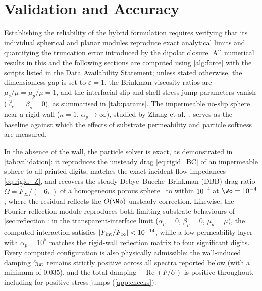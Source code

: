 \section{Validation and Accuracy}\label{sec:validation}

Establishing the reliability of the hybrid formulation requires verifying that its individual spherical and planar
modules reproduce exact analytical limits and quantifying the truncation error introduced by the dipolar closure. All
numerical results in this and the following sections are computed using \cref{alg:force} with the scripts listed in the
Data Availability Statement; unless stated otherwise, the dimensionless gap is set to $\varepsilon=1$, the Brinkman
viscosity ratios are $\mu_s/\mu=\mu_p/\mu=1$, and the interfacial slip and shell stress-jump parameters vanish
($\hat\ell_c=\beta_s=0$), as summarised in \cref{tab:params}. The impermeable no-slip sphere near a rigid wall
($\kappa=1$, $\alpha_p\to\infty$), studied by Zhang et al.~\cite{zhang2023unsteady}, serves as the baseline against which
the effects of substrate permeability and particle softness are measured.

In the absence of the wall, the particle solver is exact, as demonstrated in \cref{tab:validation}: it reproduces the
unsteady drag \eqref{eq:rigid_BC} of an impermeable sphere to all printed digits, matches the exact incident-flow
impedances \eqref{eq:rigid_Z}, and recovers the steady Debye--Bueche--Brinkman (DBB) drag ratio $\Omega=\hat
F_\infty/(-6\pi)$ of a homogeneous porous sphere~\cite{brinkman1949calculation} to within $10^{-4}$ at $\Wo=10^{-4}$, where
the residual reflects the $O(\Wo)$ unsteady correction. Likewise, the Fourier reflection module reproduces both limiting
substrate behaviours of \cref{sec:reflection}: in the transparent-interface limit ($\alpha_p=0$, $\beta_p=0$, $\mu_p=\mu$),
the computed interaction satisfies $|F_{\rm int}/F_\infty|<10^{-14}$, while a low-permeability layer with
$\alpha_p=10^5$ matches the rigid-wall reflection matrix to four significant digits. Every computed configuration is also
physically admissible: the wall-induced damping $\hat\gamma_{\rm int}$ remains strictly positive across all spectra
reported below (with a minimum of $0.035$), and the total damping $-\operatorname{Re}(F/U)$ is positive throughout,
including for positive stress jumps (\cref{app:checks}).

